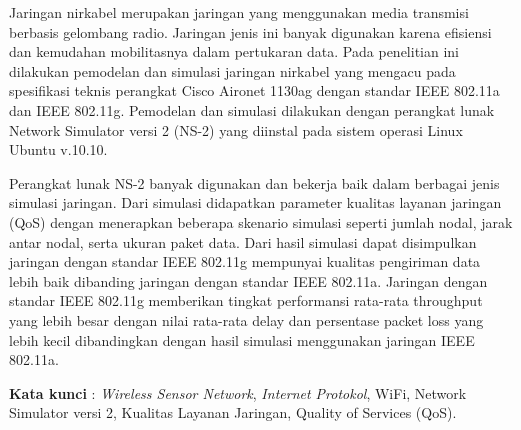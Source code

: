 \documentclass{jtetiproposalskripsi}
\begin{document}
\cover

\approvalpage


\begin{abstractind}
Jaringan nirkabel merupakan jaringan yang menggunakan media transmisi berbasis gelombang radio. Jaringan jenis ini banyak digunakan karena efisiensi dan kemudahan mobilitasnya dalam pertukaran data. Pada penelitian ini dilakukan pemodelan dan simulasi jaringan nirkabel yang mengacu pada spesifikasi teknis perangkat Cisco Aironet 1130ag dengan standar IEEE 802.11a dan IEEE 802.11g. Pemodelan dan simulasi dilakukan dengan perangkat lunak Network Simulator versi 2 (NS-2) yang diinstal pada sistem operasi Linux Ubuntu v.10.10.

Perangkat lunak NS-2 banyak digunakan dan bekerja baik dalam berbagai jenis simulasi jaringan. Dari simulasi didapatkan parameter kualitas layanan jaringan (QoS) dengan menerapkan beberapa skenario simulasi seperti jumlah nodal, jarak antar nodal, serta ukuran paket data. Dari hasil simulasi dapat disimpulkan jaringan dengan standar IEEE 802.11g mempunyai kualitas pengiriman data lebih baik dibanding jaringan dengan standar IEEE 802.11a. Jaringan dengan standar IEEE 802.11g memberikan tingkat performansi rata-rata throughput yang lebih besar dengan nilai rata-rata delay dan persentase packet loss yang lebih kecil dibandingkan dengan hasil simulasi menggunakan jaringan IEEE 802.11a.


\bigskip
\textbf{Kata kunci} : \emph{Wireless Sensor Network}, \emph{Internet Protokol}, WiFi, Network Simulator versi 2, Kualitas Layanan Jaringan, Quality of Services (QoS).
\end{abstractind}

\tableofcontents
{}
\clearpage{}\setcounter{page}{1}

\end{document}
